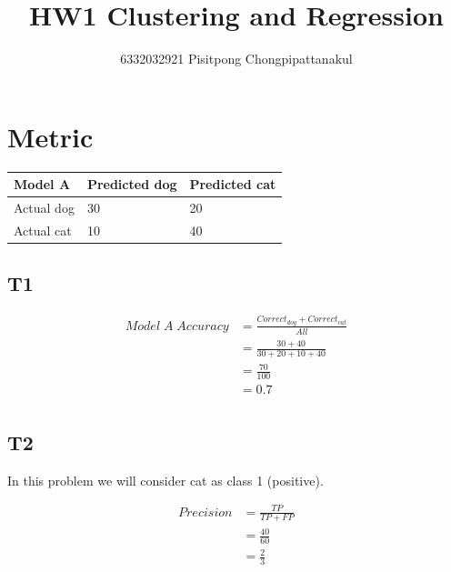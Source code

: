 \documentclass[12pt, a4paper]{article}
\title{HW1 Clustering and Regression}
\author{6332032921 Pisitpong Chongpipattanakul}
\begin{document}
\maketitle
\tableofcontents
\noindent\makebox[\linewidth]{\rule{\linewidth}{0.2pt}}

\pagebreak
\section{Metric}

\begin{center}
    \begin{tabular}{| m{5em} | m{7em} | m{7em} |} 
        \hline
        Model A & Predicted dog & Predicted cat \\
        \hline\hline
        Actual dog & 30 & 20 \\ 
        \hline
        Actual cat & 10 & 40 \\
        \hline
    \end{tabular}
\end{center}

\subsection{T1}

\begin{equation}
    \label{Model A Accuracy}
    \begin{split}
        Model\;A\;Accuracy & = \frac{Correct_{dog} + Correct_{cat}}{All} \\
                            & = \frac{30 + 40}{30 + 20 + 10 + 40} \\
                            & = \frac{70}{100} \\
                            & = 0.7 \\
    \end{split}
\end{equation}

\subsection{T2}

In this problem we will consider cat as class 1 (positive).

\begin{equation}
    \label{Precision Cat}
    \begin{split}
        Precision & = \frac{TP}{TP + FP} \\
                    & = \frac{40}{60} \\
                    & = \frac{2}{3} \\
    \end{split}
\end{equation}
\end{document}

